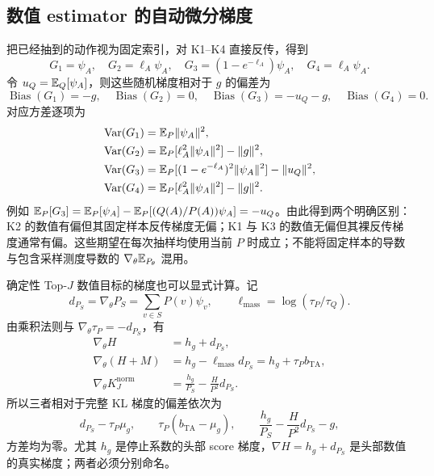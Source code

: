 \subsection{数值 estimator 的自动微分梯度}

把已经抽到的动作视为固定索引，对 K1--K4 直接反传，得到
\begin{equation*}
 G_1=\psi_A,\quad G_2=\ell_A\psi_A,\quad
 G_3=(1-e^{-\ell_A})\psi_A,\quad G_4=\ell_A\psi_A.
\end{equation*}
令 $u_Q=\mathbb E_Q[\psi_A]$，则这些随机梯度相对于 $g$ 的偏差为
\begin{equation*}
 \operatorname{Bias}(G_1)=-g,\quad
 \operatorname{Bias}(G_2)=0,\quad
 \operatorname{Bias}(G_3)=-u_Q-g,\quad
 \operatorname{Bias}(G_4)=0.
\end{equation*}
对应方差逐项为
\begin{align*}
 \operatorname{Var}(G_1)&=\mathbb E_P\lVert \psi_A\rVert^2,\\
 \operatorname{Var}(G_2)&=\mathbb E_P[\ell_A^2\lVert \psi_A\rVert^2]-\lVert g\rVert^2,\\
 \operatorname{Var}(G_3)&=\mathbb E_P[(1-e^{-\ell_A})^2\lVert \psi_A\rVert^2]-\lVert u_Q\rVert^2,\\
 \operatorname{Var}(G_4)&=\mathbb E_P[\ell_A^2\lVert \psi_A\rVert^2]-\lVert g\rVert^2.
\end{align*}
例如 $\mathbb E_P[G_3]=\mathbb E_P[\psi_A]-\mathbb E_P[(Q(A)/P(A))\psi_A]=-u_Q$。由此得到两个明确区别：K2 的数值有偏但其固定样本反传梯度无偏；K1 与 K3 的数值无偏但其裸反传梯度通常有偏。这些期望在每次抽样均使用当前 $P$ 时成立；不能将固定样本的导数与包含采样测度导数的 $\nabla_\theta\mathbb E_{P_\theta}$ 混用。

确定性 Top-$J$ 数值目标的梯度也可以显式计算。记
\begin{equation*}
 d_{P_S}=\nabla_\theta P_S=\sum_{v\in S}P(v)\psi_v,
 \qquad \ell_{\mathrm{mass}}=\log(\tau_P/\tau_Q).
\end{equation*}
由乘积法则与 $\nabla_\theta\tau_P=-d_{P_S}$，有
\begin{align*}
 \nabla_\theta H&=h_g+d_{P_S},\\
 \nabla_\theta(H+M)&=h_g-\ell_{\mathrm{mass}}d_{P_S}=h_g+\tau_Pb_{\mathrm{TA}},\\
 \nabla_\theta K_J^{\mathrm{norm}}
 &=\frac{h_g}{P_S}-\frac{H}{P^2}d_{P_S}.
\end{align*}
所以三者相对于完整 KL 梯度的偏差依次为
\begin{equation*}
 d_{P_S}-\tau_P\mu_g,\qquad
 \tau_P(b_{\mathrm{TA}}-\mu_g),\qquad
 \frac{h_g}{P_S}-\frac{H}{P^2}d_{P_S}-g,
\end{equation*}
方差均为零。尤其 $h_g$ 是停止系数的头部 score 梯度，$\nabla H=h_g+d_{P_S}$ 是头部数值的真实梯度；两者必须分别命名。

